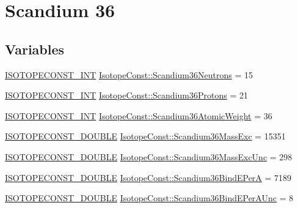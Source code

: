 \hypertarget{group___isotope_const-_scandium-_sc36}{}\section{Scandium 36}
\label{group___isotope_const-_scandium-_sc36}
\subsection*{Variables}
\begin{DoxyCompactItemize}
\item 
\mbox{\hyperlink{group___isotope_const-_macros_ga5f18360b3e99483a35c32d789e62621c}{I\+S\+O\+T\+O\+P\+E\+C\+O\+N\+S\+T\+\_\+\+I\+NT}} \mbox{\hyperlink{group___isotope_const-_scandium-_sc36_ga23ac7a6e2eacef79f00eb701c9d0c149}{Isotope\+Const\+::\+Scandium36\+Neutrons}} = 15
\item 
\mbox{\hyperlink{group___isotope_const-_macros_ga5f18360b3e99483a35c32d789e62621c}{I\+S\+O\+T\+O\+P\+E\+C\+O\+N\+S\+T\+\_\+\+I\+NT}} \mbox{\hyperlink{group___isotope_const-_scandium-_sc36_gad4993661b9f83c37a8a97058c79e0c0a}{Isotope\+Const\+::\+Scandium36\+Protons}} = 21
\item 
\mbox{\hyperlink{group___isotope_const-_macros_ga5f18360b3e99483a35c32d789e62621c}{I\+S\+O\+T\+O\+P\+E\+C\+O\+N\+S\+T\+\_\+\+I\+NT}} \mbox{\hyperlink{group___isotope_const-_scandium-_sc36_ga90f1079f40627154cd3a5bcf25191faf}{Isotope\+Const\+::\+Scandium36\+Atomic\+Weight}} = 36
\item 
\mbox{\hyperlink{group___isotope_const-_macros_ga8f45a7272ce02c0b4c65c44636ed719a}{I\+S\+O\+T\+O\+P\+E\+C\+O\+N\+S\+T\+\_\+\+D\+O\+U\+B\+LE}} \mbox{\hyperlink{group___isotope_const-_scandium-_sc36_ga89d4d0eef018f65b2b36e141d04d73cd}{Isotope\+Const\+::\+Scandium36\+Mass\+Exc}} = 15351
\item 
\mbox{\hyperlink{group___isotope_const-_macros_ga8f45a7272ce02c0b4c65c44636ed719a}{I\+S\+O\+T\+O\+P\+E\+C\+O\+N\+S\+T\+\_\+\+D\+O\+U\+B\+LE}} \mbox{\hyperlink{group___isotope_const-_scandium-_sc36_gade14fd62b3ef4deba6b87d57d0f9bd1c}{Isotope\+Const\+::\+Scandium36\+Mass\+Exc\+Unc}} = 298
\item 
\mbox{\hyperlink{group___isotope_const-_macros_ga8f45a7272ce02c0b4c65c44636ed719a}{I\+S\+O\+T\+O\+P\+E\+C\+O\+N\+S\+T\+\_\+\+D\+O\+U\+B\+LE}} \mbox{\hyperlink{group___isotope_const-_scandium-_sc36_gab7bf1c177cd1f89ba11b527c65e57644}{Isotope\+Const\+::\+Scandium36\+Bind\+E\+PerA}} = 7189
\item 
\mbox{\hyperlink{group___isotope_const-_macros_ga8f45a7272ce02c0b4c65c44636ed719a}{I\+S\+O\+T\+O\+P\+E\+C\+O\+N\+S\+T\+\_\+\+D\+O\+U\+B\+LE}} \mbox{\hyperlink{group___isotope_const-_scandium-_sc36_ga3bd92c01f562489827f2d174d7582c18}{Isotope\+Const\+::\+Scandium36\+Bind\+E\+Per\+A\+Unc}} = 8

\end{DoxyCompactItemize}
